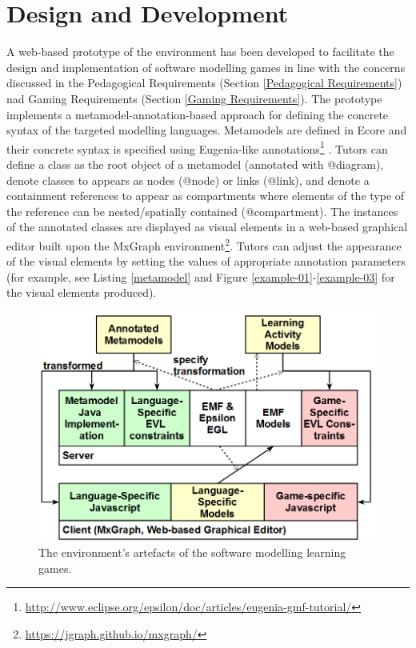 \documentclass[10pt, a4paper]{report} \usepackage[titletoc]{appendix}
\begin{document}
\section{Design and Development}
A web-based prototype of the environment has been developed to facilitate the design and implementation of software modelling games in line with the concerns discussed in the Pedagogical Requirements (Section \ref{Pedagogical Requirements}) nad Gaming Requirements (Section \ref{Gaming Requirements}). The prototype implements a metamodel-annotation-based approach for defining the concrete syntax of the targeted modelling languages. Metamodels are defined in Ecore \cite{steinberg2008emf} and their concrete syntax is specified using Eugenia-like annotations\footnote{\url{http://www.eclipse.org/epsilon/doc/articles/eugenia-gmf-tutorial/}} \cite{kolovos2015eugenia}. Tutors can define a class as the root object of a metamodel (annotated with {\selectfont @diagram}), denote classes to appears as nodes ({\selectfont @node}) or links ({\selectfont @link}), and denote a containment references to appear as compartments where elements of the type of the reference can be nested/spatially contained ({\selectfont @compartment}). The instances of the annotated classes are displayed as visual elements in a web-based graphical editor built upon the MxGraph environment\footnote{\url{https://jgraph.github.io/mxgraph/}}. Tutors can adjust the appearance of the visual elements by setting the values of appropriate annotation parameters (for example, see Listing \ref{metamodel} and Figure \ref{example-01}-\ref{example-03} for the visual elements produced).

\begin{figure}[t!]
\centering
\includegraphics[width=12cm]{artefacts}
\caption{The environment's artefacts of the software modelling learning games.}
\label{artefacts}
\end{figure}
\end{document}
